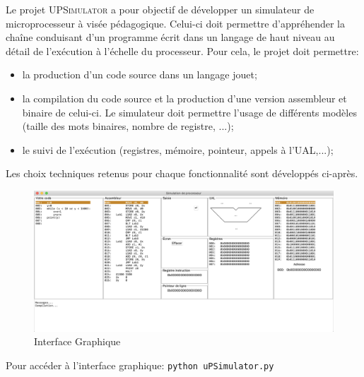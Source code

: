 Le projet \textsc{UPSimulator} a pour objectif de développer un simulateur de microprocesseur à visée pédagogique. Celui-ci doit permettre d'appréhender la chaîne conduisant d'un programme écrit dans un langage de haut niveau au détail de l'exécution à l'échelle du processeur. Pour cela, le projet doit permettre:
\begin{itemize}
	\item la production d'un code source dans un langage jouet;
	\item la compilation du code source et la production d'une version assembleur et binaire de celui-ci. Le simulateur doit permettre l'usage de différents modèles (taille des mots binaires, nombre de registre, ...);
	\item le suivi de l'exécution (registres, mémoire, pointeur, appels à l'UAL,...);
\end{itemize}

Les choix techniques retenus pour chaque fonctionnalité sont développés ci-après.

\begin{figure}[h!]
	\includegraphics[width=\textwidth]{./Pictures/Header.png}
	\caption{\label{fig:gui} Interface Graphique}
\end{figure}

Pour accéder à l'interface graphique: \texttt{python uPSimulator.py}